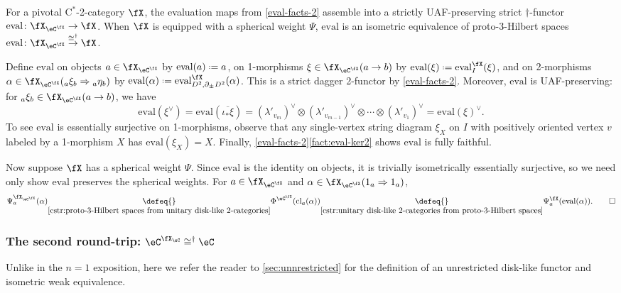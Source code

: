 \documentclass[12pt,reqno]{amsart}
\newcounter{alpha}\renewcommand\thealpha{\upshape\Alph{alpha}}
\newcommand{\cl}{\mathrm{cl}}
\newcommand{\eval}{\mathrm{eval}}
\newcommand{\psn}{\Phi}
\newcommand{\C}{\eC}
\newcommand{\fcj}[1]{\overline{#1}}
\newcommand{\Cstar}{\ensuremath{\mathrm{C}^{*}}}
\DeclareRobustCommand{\coloneq}{\mathrel{\vcenter{\baselineskip0.5ex\lineskiplimit0pt\hbox{\scriptsize{\upshape.}}\hbox{\scriptsize{\upshape.}}}}=}
\begin{document}
\begin{proposition} 
\label{XCXcongX-n-2}
For a pivotal $\Cstar$-2-category $\fX$, the evaluation maps from \cref{eval-facts-2} assemble into a strictly UAF-preserving strict $\dag$-functor $\eval\colon\fX_{\C^\fX}\to\fX$. When $\fX$ is equipped with a spherical weight $\Psi$, $\eval$ is an isometric equivalence of proto-3-Hilbert spaces $\eval\colon \fX_{\C^\fX}\overset{\cong^\dag}\to\fX$.
\end{proposition} 

\begin{pf}
Define $\eval$ on objects $a\in\fX_{\C^\fX}$ by $\eval(a)\coloneq a$, on 1-morphisms $\xi\in\fX_{\C^\fX}(a\to b)$ by $\eval(\xi)\coloneq\eval^\fX_{I}(\xi)$, and on 2-morphisms $\alpha\in\fX_{\C^\fX}({}_a\xi_b\Rightarrow{}_a\eta_b)$ by
$\eval(\alpha)\coloneq\eval^\fX_{D^2,\partial_{\pm}D^2}(\alpha)$. This is a strict dagger 2-functor by \cref{eval-facts-2}. Moreover, $\eval$ is UAF-preserving: for ${}_a\xi_b\in\fX_{\C^\fX}(a\to b)$, we have
\[
\eval(\xi^\vee)=\eval(\fcj{\iota_*\xi})=(\lambda'_{v_m})^\vee\otimes(\lambda'_{v_{m-1}})^\vee\otimes\cdots\otimes(\lambda'_{v_1})^\vee=\eval(\xi)^\vee.
\]
To see $\eval$ is essentially surjective on 1-morphisms, observe that any single-vertex string diagram $\xi_X$ on $I$ with positively oriented vertex $v$ labeled by a 1-morphism $X$ has $\eval(\xi_X)=X$. Finally, \cref{eval-facts-2}\ref{fact:eval-ker2} shows $\eval$ is fully faithful. 

Now suppose $\fX$ has a spherical weight $\Psi$. Since $\eval$ is the identity on objects, it is trivially isometrically essentially surjective, so we need only show $\eval$ preserves the spherical weights. For $a\in\fX_{\C^{\fX}}$ and $\alpha\in\fX_{\C^{\fX}}(1_a\Rightarrow 1_a)$,
\[
\Psi^{\fX_{\C^\fX}}_a(\alpha)\underset{\eqref{cstr:proto-3-Hilbert spaces from unitary disk-like 2-categories}}{\defeq{}}\psn^{\C^\fX}(\cl_a(\alpha))\underset{\eqref{cstr:unitary disk-like 2-categories from proto-3-Hilbert spaces}}{\defeq{}}\Psi^\fX_a(\eval(\alpha)).\qedhere
\]
\end{pf}

\subsubsection{The second round-trip: \texorpdfstring{$\C^{\fX_\C}\cong^\dag\C$}{C(X(C)) = C}}

Unlike in the $n=1$ exposition, here we refer the reader to \cref{sec:unnrestricted} for the definition of an unrestricted disk-like functor and isometric weak equivalence.
\end{document}
